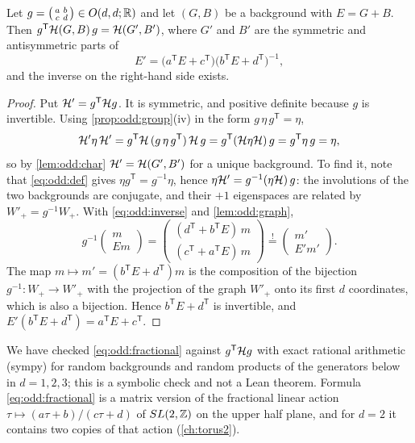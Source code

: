 \begin{theorem}\label{thm:odd:action}
Let $g=\left(\begin{smallmatrix}a&b\\c&d\end{smallmatrix}\right)\in O(d,d;\mathbb{R})$ and let
$(G,B)$ be a background with $E=G+B$. Then $g^{\mathsf T}\mathcal{H}(G,B)\,g=\mathcal{H}(G',B')$, where
$G'$ and $B'$ are the symmetric and antisymmetric parts of
\begin{equation}\label{eq:odd:fractional}
 E'=\big(a^{\mathsf T}E+c^{\mathsf T}\big)\big(b^{\mathsf T}E+d^{\mathsf T}\big)^{-1},
\end{equation}
and the inverse on the right-hand side exists.
\end{theorem}
\begin{proof}
Put $\mathcal{H}'=g^{\mathsf T}\mathcal{H} g$. It is symmetric, and positive definite because $g$ is
invertible. Using \cref{prop:odd:group}(iv) in the form $g\,\eta\,g^{\mathsf T}=\eta$,
\[
 \mathcal{H}'\eta\,\mathcal{H}'=g^{\mathsf T}\mathcal{H}\,(g\,\eta\,g^{\mathsf T})\,\mathcal{H}\,g
 =g^{\mathsf T}(\mathcal{H}\eta\mathcal{H})\,g=g^{\mathsf T}\eta\,g=\eta ,
\]
so by \cref{lem:odd:char} $\mathcal{H}'=\mathcal{H}(G',B')$ for a unique background. To find it, note
that \eqref{eq:odd:def} gives $\eta g^{\mathsf T}=g^{-1}\eta$, hence
$\eta\mathcal{H}'=g^{-1}(\eta\mathcal{H})\,g$: the involutions of the two backgrounds are conjugate, and
their $+1$ eigenspaces are related by $W'_+=g^{-1}W_+$. With \eqref{eq:odd:inverse} and
\cref{lem:odd:graph},
\[
 g^{-1}\begin{pmatrix}m\\Em\end{pmatrix}
 =\begin{pmatrix}(d^{\mathsf T}+b^{\mathsf T}E)\,m\\(c^{\mathsf T}+a^{\mathsf T}E)\,m
 \end{pmatrix}\overset{!}{=}\begin{pmatrix}m'\\E'm'\end{pmatrix}.
\]
The map $m\mapsto m'=(b^{\mathsf T}E+d^{\mathsf T})m$ is the composition of the bijection
$g^{-1}:W_+\to W'_+$ with the projection of the graph $W'_+$ onto its first $d$
coordinates, which is also a bijection. Hence $b^{\mathsf T}E+d^{\mathsf T}$ is invertible,
and $E'(b^{\mathsf T}E+d^{\mathsf T})=a^{\mathsf T}E+c^{\mathsf T}$.
\end{proof}

We have checked \eqref{eq:odd:fractional} against $g^{\mathsf T}\mathcal{H} g$ with exact rational
arithmetic (sympy) for random backgrounds and random products of the generators below in
$d=1,2,3$; this is a symbolic check and not a Lean theorem. Formula
\eqref{eq:odd:fractional} is a matrix version of the fractional linear action
$\tau\mapsto(a\tau+b)/(c\tau+d)$ of $SL(2,\mathbb{Z})$ on the upper half plane, and for $d=2$ it
contains two copies of that action (\cref{ch:torus2}).

